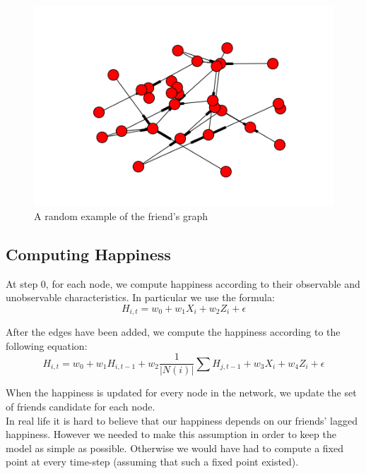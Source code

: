 \documentclass[11pt]{article}
\begin{document}
\begin{figure}[h]
\centering
\includegraphics[scale=.5]{example_graph.png}
\caption{A random example of the friend's graph }
\label{fig:graph}
\end{figure}

\FloatBarrier
\subsection{Computing Happiness}

At step 0, for each node, we compute happiness according to their observable and unobservable characteristics. In particular we use the formula:
$$H_{i,t} = w_0 +w_1 X_i+w_2 Z_i + \epsilon$$

 After the edges have been added, we compute the happiness according to the following equation:
$$H_{i,t} = w_0 +w_1 H_{i,t-1} + w_2 \frac{1}{|N(i)|} \sum\limits H_{j,t-1} + w_3 X_{i} + w_4 Z_{i} + \epsilon $$

When the happiness is updated for every node in the network, we update the set of friends candidate for each node.\\

In real life it is hard to believe that our happiness depends on our friends' lagged happiness. However we needed to make this assumption in order to keep the model as simple as possible. Otherwise we would have  had to compute a fixed point at every time-step (assuming that such a fixed point existed). 
\end{document}
